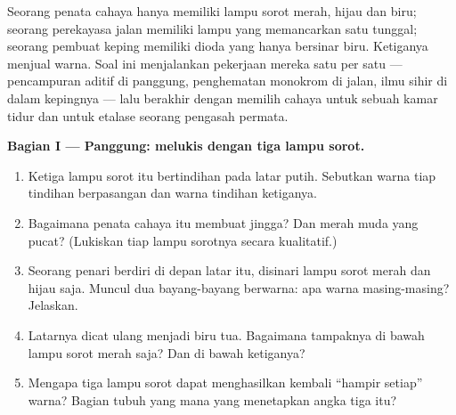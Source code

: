 \begin{problem}
\label{pb:g11:color-light-sources:1}
Seorang penata cahaya hanya memiliki lampu sorot merah, hijau dan biru;
seorang perekayasa jalan memiliki lampu yang memancarkan satu  tunggal; seorang pembuat keping memiliki dioda yang hanya
bersinar biru. Ketiganya menjual warna. Soal ini menjalankan pekerjaan
mereka satu per satu --- pencampuran aditif di panggung, penghematan
monokrom di jalan, ilmu sihir  di dalam kepingnya --- lalu
berakhir dengan memilih cahaya untuk sebuah kamar tidur dan untuk
etalase seorang pengasah permata.

\medskip
\noindent\textbf{Bagian I --- Panggung: melukis dengan tiga lampu sorot.}
\begin{enumerate}
  \item Ketiga lampu sorot itu bertindihan pada latar putih. Sebutkan
        warna tiap tindihan berpasangan dan warna tindihan ketiganya.
  \item Bagaimana penata cahaya itu membuat jingga? Dan merah muda yang
        pucat? (Lukiskan  tiap lampu sorotnya secara kualitatif.)
  \item Seorang penari berdiri di depan latar itu, disinari lampu sorot
        merah dan hijau saja. Muncul dua bayang-bayang berwarna: apa
        warna masing-masing? Jelaskan.
  \item Latarnya dicat ulang menjadi biru tua. Bagaimana tampaknya di
        bawah lampu sorot merah saja? Dan di bawah ketiganya?
  \item Mengapa tiga lampu sorot dapat menghasilkan kembali ``hampir
        setiap'' warna? Bagian tubuh yang mana yang menetapkan angka
        tiga itu?
\end{enumerate}


\end{problem}
